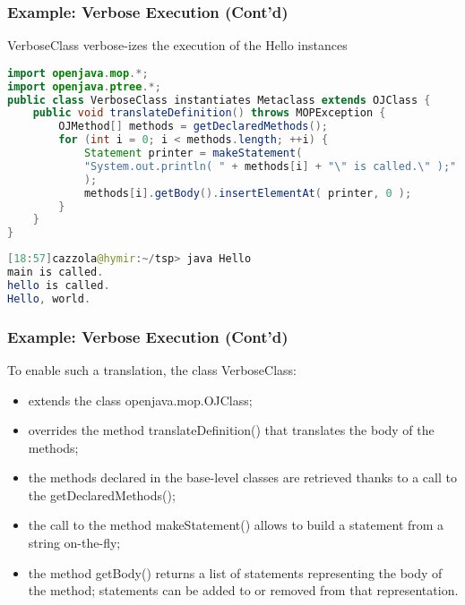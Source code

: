 \subsubsection{Example: Verbose Execution (Cont'd)}

VerboseClass verbose-izes the execution of the Hello instances

\begin{lstlisting}[language=Java]
import openjava.mop.*;
import openjava.ptree.*;
public class VerboseClass instantiates Metaclass extends OJClass {
	public void translateDefinition() throws MOPException {
		OJMethod[] methods = getDeclaredMethods();
		for (int i = 0; i < methods.length; ++i) {
			Statement printer = makeStatement(
			"System.out.println( " + methods[i] + "\" is called.\" );"
			);
			methods[i].getBody().insertElementAt( printer, 0 );
		}
	}
}
\end{lstlisting}

\begin{lstlisting}[language=Java]
[18:57]cazzola@hymir:~/tsp> java Hello
main is called.
hello is called.
Hello, world.
\end{lstlisting}

\subsubsection{Example: Verbose Execution (Cont'd)}

To enable such a translation, the class VerboseClass:

\begin{itemize}
	\item extends the class openjava.mop.OJClass;
	\item overrides the method translateDefinition() that translates the body of the methods;
	\item the methods declared in the base-level classes are retrieved thanks to a call to the getDeclaredMethods();
	\item the call to the method makeStatement() allows to build a statement from a string on-the-fly;
	\item the method getBody() returns a list of statements representing the body of the method; statements can be added to or removed from that representation.
\end{itemize}



